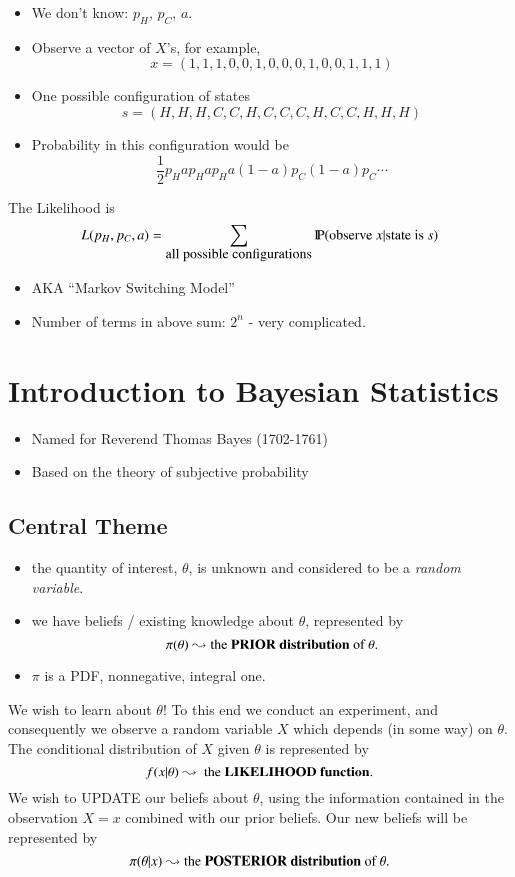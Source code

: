 \documentclass[captions=tableheading]{scrbook}
\begin{document}
\begin{itemize}
\begin{itemize}
\item We don't know: $p_{H}$, $p_{C}$, $a$.
\item Observe a vector of $X$'s, for example,
  \[
  x = (1,1,1,0,0,1,0,0,0,1,0,0,1,1,1)
  \]
\item One possible configuration of states
  \[
  s = (H,H,H,C,C,H,C,C,C,H,C,C,H,H,H)
  \]
\item Probability in this configuration would be
  \[
  \frac{1}{2}p_{H}ap_{H}ap_{H}a(1-a)p_{C}(1-a)p_{C}\cdots
  \]
\end{itemize}

The Likelihood is
\[
L(p_{H},p_{C},a) = \sum_{\mbox{all possible configurations}}\P(\mbox{observe $x$}|\mbox{state is $s$})
\]

\begin{itemize}
\item AKA ``Markov Switching Model''
\item Number of terms in above sum: $2^{n}$ - very complicated.
\end{itemize}

\end{itemize} %
\section{Introduction to Bayesian Statistics}
\label{sec-1_3}


\begin{itemize}
\item Named for Reverend Thomas Bayes (1702-1761)
\item Based on the theory of subjective probability
\end{itemize}
\subsection{Central Theme}
\label{sec-1_3_1}


\begin{itemize}
\item the quantity of interest, $\theta$, is unknown and considered to be a \emph{random variable}.
\item we have beliefs / existing knowledge about $\theta$, represented by
  \[
  \pi(\theta) \leadsto \mbox{the \textbf{PRIOR distribution} of $\theta$.}
  \]
\item $\pi$ is a PDF, nonnegative, integral one.
\end{itemize}
We wish to learn about \(\theta\)! To this end we conduct an experiment, and consequently we observe a random variable $X$ which depends (in some way) on $\theta$. The conditional distribution of $X$ given $\theta$ is represented by
\[
f(x|\theta) \leadsto \mbox{ the \textbf{LIKELIHOOD function}}.
\]
We wish to UPDATE our beliefs about $\theta$, using the information contained in the observation $X=x$ combined with our prior beliefs. Our new beliefs will be represented by
\[
\pi(\theta|x) \leadsto \mbox{the \textbf{POSTERIOR distribution} of $\theta$.}
\]
\end{document}
